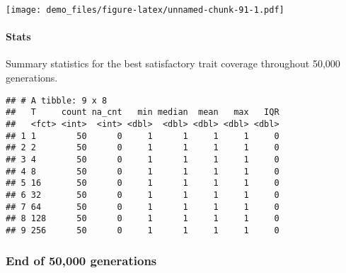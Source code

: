 \documentclass[]{book}
\newenvironment{Shaded}{\begin{snugshade}}{\end{snugshade}}
\newcommand{\DataTypeTok}[1]{\textcolor[rgb]{0.13,0.29,0.53}{#1}}
\newcommand{\KeywordTok}[1]{\textcolor[rgb]{0.13,0.29,0.53}{\textbf{#1}}}
\newcommand{\NormalTok}[1]{#1}
\newcommand{\OperatorTok}[1]{\textcolor[rgb]{0.81,0.36,0.00}{\textbf{#1}}}
\newcommand{\OtherTok}[1]{\textcolor[rgb]{0.56,0.35,0.01}{#1}}
\newcommand{\StringTok}[1]{\textcolor[rgb]{0.31,0.60,0.02}{#1}}
\let\oldparagraph\paragraph
\renewcommand{\paragraph}[1]{\oldparagraph{#1}\mbox{}}
\begin{document}
\texttt{[image: demo\_files/figure-latex/unnamed-chunk-91-1.pdf]}

\hypertarget{stats-15}{%
\paragraph{Stats}\label{stats-15}}

Summary statistics for the best satisfactory trait coverage throughout 50,000 generations.

\begin{Shaded}
\end{Shaded}

\begin{verbatim}
## # A tibble: 9 x 8
##   T     count na_cnt   min median  mean   max   IQR
##   <fct> <int>  <int> <dbl>  <dbl> <dbl> <dbl> <dbl>
## 1 1        50      0     1      1     1     1     0
## 2 2        50      0     1      1     1     1     0
## 3 4        50      0     1      1     1     1     0
## 4 8        50      0     1      1     1     1     0
## 5 16       50      0     1      1     1     1     0
## 6 32       50      0     1      1     1     1     0
## 7 64       50      0     1      1     1     1     0
## 8 128      50      0     1      1     1     1     0
## 9 256      50      0     1      1     1     1     0
\end{verbatim}

\hypertarget{end-of-50000-generations-6}{%
\subsubsection{End of 50,000 generations}\label{end-of-50000-generations-6}}
\end{document}
